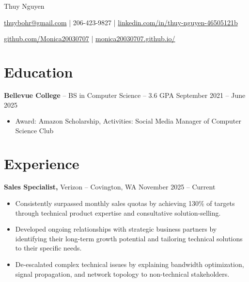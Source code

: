 \documentclass[11pt]{article}       %
\begin{document}
\centerline{\Huge Thuy Nguyen}

\vspace{5pt}

\centerline{\href{mailto:thuybohr@gmail.com}{thuybohr@gmail.com} | 206-423-9827 |
\href{https://www.linkedin.com/in/thuy-nguyen-46505121b/}{linkedin.com/in/thuy-nguyen-46505121b}}

\centerline{\href{https://github.com/Monica20030707}{github.com/Monica20030707} | 
\href{https://monica20030707.github.io/}{monica20030707.github.io/}} 

\vspace{-9pt}

\section*{Education}
\textbf{Bellevue College} -- BS in Computer Science -- 3.6 GPA \hfill September 2021 -- June 2025\\
\vspace{-9pt}
\begin{itemize}
  \item Award: Amazon Scholarship, Activities: Social Media Manager of Computer Science Club
\end{itemize}

\vspace{-18.5pt}

\section*{Experience}

\textbf{Sales Specialist,} {Verizon} -- Covington, WA \hfill November 2025 -- Current \\
\vspace{-9pt}
\begin{itemize}
  \item Consistently surpassed monthly sales quotas by achieving 130\% of targets through technical product expertise and consultative solution-selling.
  \item Developed ongoing relationships with strategic business partners by identifying their long-term growth potential and tailoring technical solutions to their specific needs.
  \item De-escalated complex technical issues by explaining bandwidth optimization, signal propagation, and network topology to non-technical stakeholders.
\end{itemize}
\end{document}
